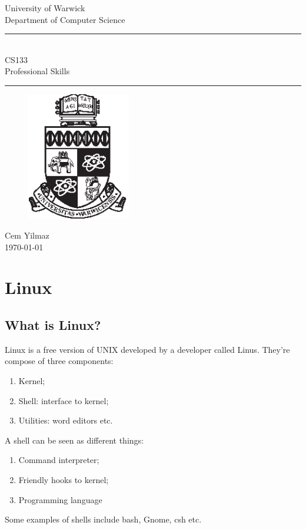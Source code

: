 \documentclass[a4paper]{article}
\theoremstyle{plain}
\theoremstyle{definition}
\newtheorem{defn}{Definition}[section]
\theoremstyle{remark}
\begin{document}
\begin{titlepage}
\begin{center}
\large
University of Warwick \\
Department of Computer Science \\
\huge
\vspace{50mm}
\rule{\linewidth}{0.5pt} \\
CS133 \\
\vspace{5mm}
\Large
Professional Skills
\rule{\linewidth}{0.5pt}
\vspace{5mm}
\begin{figure}[H]
\centering
\includegraphics[width=0.4\textwidth]{crest_black.eps}
\end{figure}
\vspace{37mm}
Cem Yilmaz\\
\today
\end{center}
\end{titlepage}
\section{Linux}
\subsection{What is Linux?}
Linux is a free version of UNIX developed by a developer called Linus. They're compose of three components:
\begin{enumerate}
	\item Kernel;
	\item Shell: interface to kernel;
	\item Utilities: word editors etc.
\end{enumerate}
\begin{tcolorbox}[colback=black!3!white,colframe=black!60!white,title=\begin{defn}Shell \label{Shell}\end{defn}]
A shell can be seen as different things:
\begin{enumerate}
	\item Command interpreter;
	\item Friendly hooks to kernel;
	\item Programming language
\end{enumerate}
Some examples of shells include bash, Gnome, csh etc.
\end{tcolorbox}
\end{document}
